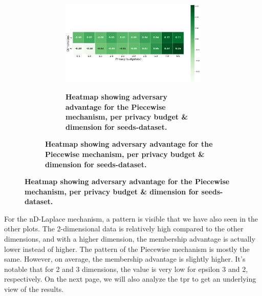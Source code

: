 {\begin{figure}[H]
\begin{subfigure}[b]{0.85\textwidth}
    \begin{subfigure}[c]{1\textwidth}
      \caption{\textbf{Heatmap showing adversary advantage for the Piecewise mechanism, per privacy budget \& dimension for seeds-dataset.}}
      \includegraphics[width=1\textwidth]{Results/nd-laplace/piecewise/circle-dataset/attack_adv.png}
      \label{fig:privacy_circle-dataset_adversial_advantage_piecewise}
    \end{subfigure}
  \end{subfigure}
\end{figure}
For the nD-Laplace mechanism, a pattern is visible that we have also seen in the other plots. The 2-dimensional data is relatively high compared to the other dimensions, and with a higher dimension, the membership advantage is actually lower instead of higher.
The pattern of the Piecewise mechanism is mostly the same. However, on average, the membership advantage is slightly higher.
It's notable that for 2 and 3 dimensions, the value is very low for epsilon 3 and 2, respectively.
On the next page, we will also analyze the \gls{tpr} to get an underlying view of the results.

}
